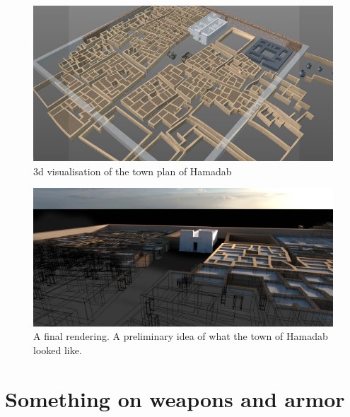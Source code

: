 \documentclass[a4paper,12pt]{scrreprt}
\begin{document}
\begin{figure}[H]
	\centering
	\includegraphics[width=\textwidth]{img/3d_visualization_hamadab}
	\caption{3d visualisation of the town plan of Hamadab}
\end{figure}

\begin{figure}[H]
	\centering
	\includegraphics[width=\textwidth]{img/rendering_hamadab}
	\caption{A final rendering. A preliminary idea of what the town of Hamadab looked like.}
\end{figure}

\section{Something on weapons and armor}
\end{document}
